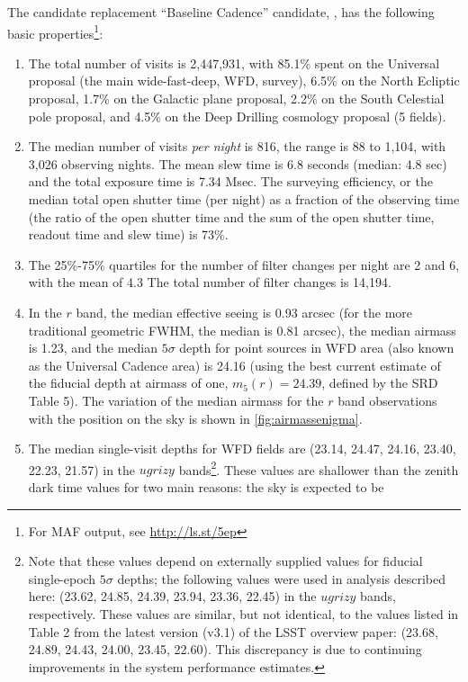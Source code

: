 The candidate replacement ``Baseline Cadence'' candidate,
, has the following basic
properties\footnote{For MAF output, see \url{http://ls.st/5ep}}:
\begin{enumerate}
\item The total number of visits is 2,447,931, with 85.1\% spent on
the Universal proposal (the main wide-fast-deep, WFD, survey), 6.5\% on the
North Ecliptic proposal, 1.7\% on the Galactic plane proposal, 2.2\%
on the South Celestial pole proposal, and 4.5\% on the Deep Drilling
cosmology proposal (5 fields).
\item The median number of visits {\it per night} is 816, the range is
88 to 1,104, with 3,026 observing nights. The mean slew time is 6.8
seconds (median: 4.8 sec) and the total exposure time is 7.34 Msec.
The surveying efficiency, or the median total open shutter time (per night)
as a fraction of the observing time (the ratio of the open shutter time and
the sum of the open shutter time, readout time and slew time) is 73\%.
\item
The 25\%-75\% quartiles for the number of filter changes per night are 2
and 6, with the mean of 4.3 The total number of filter changes is 14,194.
\item In the $r$ band, the median effective seeing is 0.93 arcsec (for the more
traditional geometric FWHM, the median is 0.81 arcsec), the median
airmass is 1.23, and the median $5\sigma$ depth for point sources in WFD
area (also known as the Universal Cadence area) is 24.16 (using the best
current estimate of the fiducial depth at airmass of one, $m_5(r)=24.39$,
defined by the SRD Table 5). The variation of the median airmass for the $r$
band observations with the position on the sky is shown in
\autoref{fig:airmassenigma}.
\item The median single-visit depths for WFD fields are (23.14, 24.47, 24.16,
23.40, 22.23, 21.57) in the $ugrizy$ bands\footnote{Note that these values
depend on externally supplied values for fiducial single-epoch
$5\sigma$ depths; the following values were used in analysis described
here: (23.62, 24.85, 24.39, 23.94, 23.36, 22.45) in the $ugrizy$
bands, respectively. These values are similar, but not identical, to the values
listed in Table 2 from the latest version (v3.1) of the LSST overview
paper: (23.68, 24.89, 24.43, 24.00, 23.45, 22.60). This discrepancy
is due to continuing improvements in the system performance estimates.}.
These values are shallower than
the zenith dark time values for two main reasons: the sky is expected to be

\end{enumerate}

